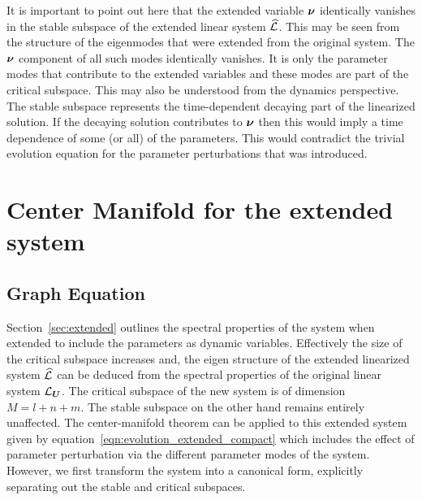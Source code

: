 It is important to point out here that the extended variable $\boldsymbol{\nu}$ identically vanishes in the stable subspace of the extended linear system $\mathcal{\widehat{L}}$. This may be seen from the structure of the eigenmodes that were extended from the original system. The $\boldsymbol{\nu}$ component of all such modes identically vanishes. It is only the parameter modes that contribute to the extended variables and these modes are part of the critical subspace. This may also be understood from the dynamics perspective. The stable subspace represents the time-dependent decaying part of the linearized solution. If the decaying solution contributes to $\boldsymbol{\nu}$ then this would imply a time dependence of some (or all) of the parameters. This would contradict the trivial evolution equation for the parameter perturbations that was introduced. 

\section{Center Manifold for the extended system}
\label{sec:center_manifold_derivation}

\subsection{Graph Equation}
\label{sec:graph_equation}

Section~\ref{sec:extended} outlines the spectral properties of the system when extended to include the parameters as dynamic variables. Effectively the size of the critical subspace increases and, the eigen structure of the extended linearized system $\mathcal{\widehat{L}}$ can be deduced from the spectral properties of the original linear system $\mathcal{L}_{\boldsymbol{U}}$. The critical subspace of the new system is of dimension $M=l+n+m$. The stable subspace on the other hand remains entirely unaffected. The center-manifold theorem can be applied to this extended system given by equation~\eqref{eqn:evolution_extended_compact} which includes the effect of parameter perturbation via the different parameter modes of the system. However, we first transform the system into a canonical form, explicitly separating out the stable and critical subspaces. 

